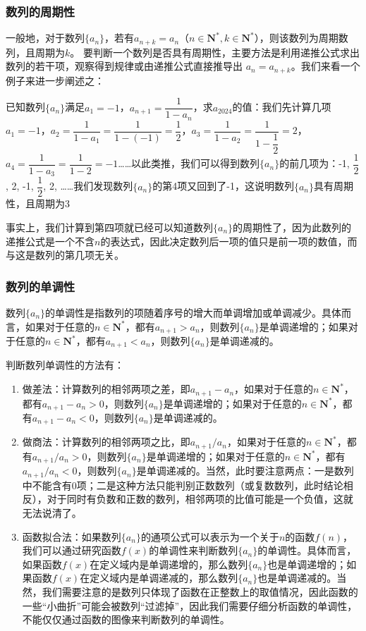 \documentclass{article}
\begin{document}
\newpage
\subsubsection{数列的周期性}

一般地，对于数列$\{a_n\}$，若有$a_{n+k} = a_n$（$n \in \mathbf{N}^*, k \in \mathbf{N}^*$），则该数列为{周期数列}，且周期为$k$。
要判断一个数列是否具有周期性，主要方法是利用递推公式求出数列的若干项，观察得到规律或由递推公式直接推导出 \(a_n = a_{n+k}\)。我们来看一个例子来进一步阐述之：

已知数列$\{a_n\}$满足$a_1 = -1$，$a_{n+1} = \dfrac{1}{1 - a_n}$，求$a_{2024}$的值：我们先计算几项$a_1 = -1$，$a_2 = \dfrac{1}{1 - a_1} = \dfrac{1}{1 - (-1)} = \dfrac{1}{2}$，$a_3 = \dfrac{1}{1 - a_2} = \dfrac{1}{1 - \dfrac{1}{2}} = 2$，$a_4 = \dfrac{1}{1 - a_3} = \dfrac{1}{1 - 2} = -1$……以此类推，我们可以得到数列$\{a_n\}$的前几项为：-1, $\dfrac{1}{2}$, 2, -1, $\dfrac{1}{2}$, 2, ……我们发现数列$\{a_n\}$的第4项又回到了-1，这说明数列$\{a_n\}$具有周期性，且周期为3

事实上，我们计算到第四项就已经可以知道数列$\{a_n\}$的周期性了，因为此数列的递推公式是一个不含$n$的表达式，因此决定数列后一项的值只是前一项的数值，而与这是数列的第几项无关。

\subsubsection{数列的单调性}
数列$\{a_n\}$的单调性是指数列的项随着序号的增大而单调增加或单调减少。具体而言，如果对于任意的$n \in \mathbf{N}^*$，都有$a_{n+1} > a_n$，则数列$\{a_n\}$是单调递增的；如果对于任意的$n \in \mathbf{N}^*$，都有$a_{n+1} < a_n$，则数列$\{a_n\}$是单调递减的。

判断数列单调性的方法有：

\begin{enumerate}
\item 做差法：计算数列的相邻两项之差，即$a_{n+1} - a_n$，如果对于任意的$n \in \mathbf{N}^*$，都有$a_{n+1} - a_n > 0$，则数列$\{a_n\}$是单调递增的；如果对于任意的$n \in \mathbf{N}^*$，都有$a_{n+1} - a_n < 0$，则数列$\{a_n\}$是单调递减的。
\item 做商法：计算数列的相邻两项之比，即$a_{n+1} / a_n$，如果对于任意的$n \in \mathbf{N}^*$，都有$a_{n+1} / a_n > 0$，则数列$\{a_n\}$是单调递增的；如果对于任意的$n \in \mathbf{N}^*$，都有$a_{n+1} / a_n < 0$，则数列$\{a_n\}$是单调递减的。当然，此时要注意两点：一是数列中不能含有0项；二是这种方法只能判别正数数列（或复数数列，此时结论相反），对于同时有负数和正数的数列，相邻两项的比值可能是一个负值，这就无法说清了。
\item 函数拟合法：如果数列$\{a_n\}$的通项公式可以表示为一个关于$n$的函数$f(n)$，我们可以通过研究函数$f(x)$的单调性来判断数列$\{a_n\}$的单调性。具体而言，如果函数$f(x)$在定义域内是单调递增的，那么数列$\{a_n\}$也是单调递增的；如果函数$f(x)$在定义域内是单调递减的，那么数列$\{a_n\}$也是单调递减的。当然，我们需要注意的是数列只体现了函数在正整数上的取值情况，因此函数的一些“小曲折”可能会被数列“过滤掉”，因此我们需要仔细分析函数的单调性，不能仅仅通过函数的图像来判断数列的单调性。
\end{enumerate}
    
\end{document}

